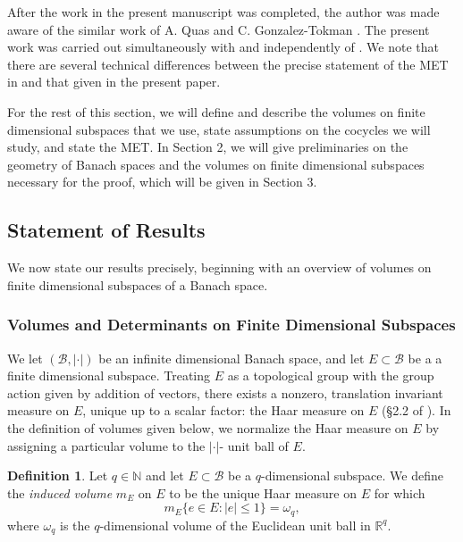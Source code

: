 \documentclass[11pt]{amsart}
\theoremstyle{theorem}
\theoremstyle{definition}
\newtheorem{defn}[thm]{Definition}
\numberwithin{equation}{section}
\newcommand{\N}{\mathbb{N}}
\newcommand{\R}{\mathbb{R}}
\newcommand{\Bc}{\mathcal{B}}
\begin{document}
After the work in the present manuscript was completed, the author was made aware of the similar work of A. Quas and C. Gonzalez-Tokman \cite{gonzalez2014concise}. The present work was carried out simultaneously with and independently of \cite{gonzalez2014concise}. We note that there are several technical differences between the precise statement of the MET in \cite{gonzalez2014concise} and that given in the present paper. 

\medskip

For the rest of this section, we will define and describe the volumes on finite dimensional subspaces that we use, state assumptions on the cocycles we will study, and state the MET. In Section 2, we will give preliminaries on the geometry of Banach spaces and the volumes on finite dimensional subspaces necessary for the proof, which will be given in Section 3. 

\subsection{Statement of Results}

We now state our results precisely, beginning with an overview of volumes on finite dimensional subspaces of a Banach space.

\subsubsection{Volumes and Determinants on Finite Dimensional Subspaces}

We let $(\Bc, |\cdot|)$ be an infinite dimensional Banach space, and let $E \subset \Bc$ be a a finite dimensional subspace. Treating $E$ as a topological group with the group action given by addition of vectors, there exists a nonzero, translation invariant measure on $E$, unique up to a scalar factor: the Haar measure on $E$ (\S2.2 of \cite{F}). In the definition of volumes given below, we normalize the Haar measure on $E$ by assigning a particular volume to the $|\cdot |$- unit ball of $E$.


\begin{defn}\label{defn:indVol}
Let $q \in \N$ and let $E \subset \Bc$ be a $q$-dimensional subspace. We define the \emph{induced volume} $m_E$ on $E$ to be the unique Haar measure on $E$ for which
\[
m_E \{e \in E : |e| \leq 1\} = \omega_q,
\]
where $\omega_q$ is the $q$-dimensional volume of the Euclidean unit ball in $\R^q$.
\end{defn}
\end{document}
